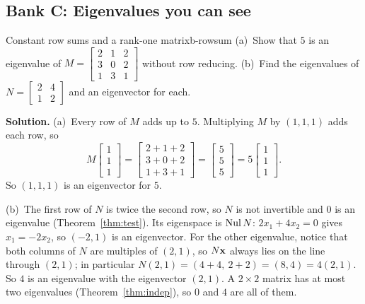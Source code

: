 \documentclass[11pt]{article}
\begin{document}
\subsection*{Bank C: Eigenvalues you can see}
\begin{exmp}{Constant row sums and a rank-one matrix}{b-rowsum}
(a)~Show that $5$ is an eigenvalue of $M=\begin{bmatrix}2&1&2\\3&0&2\\1&3&1\end{bmatrix}$ without row reducing. (b)~Find the eigenvalues of $N=\begin{bmatrix}2&4\\1&2\end{bmatrix}$ and an eigenvector for each.

\textbf{Solution.} (a)~Every row of $M$ adds up to $5$. Multiplying $M$ by $(1,1,1)$ adds each row, so
\[
M\begin{bmatrix}1\\1\\1\end{bmatrix}=\begin{bmatrix}2+1+2\\3+0+2\\1+3+1\end{bmatrix}=\begin{bmatrix}5\\5\\5\end{bmatrix}=5\begin{bmatrix}1\\1\\1\end{bmatrix}.
\]
So $(1,1,1)$ is an eigenvector for $5$.

(b)~The first row of $N$ is twice the second row, so $N$ is not invertible and $0$ is an eigenvalue (Theorem~\ref{thm:test}). Its eigenspace is $\operatorname{Nul} N$: $2x_1+4x_2=0$ gives $x_1=-2x_2$, so $(-2,1)$ is an eigenvector. For the other eigenvalue, notice that both columns of $N$ are multiples of $(2,1)$, so $N\mathbf{x}$ always lies on the line through $(2,1)$; in particular $N(2,1)=(4+4,\ 2+2)=(8,4)=4(2,1)$. So $4$ is an eigenvalue with the eigenvector $(2,1)$. A $2\times2$ matrix has at most two eigenvalues (Theorem~\ref{thm:indep}), so $0$ and $4$ are all of them.
\end{exmp}
\end{document}
